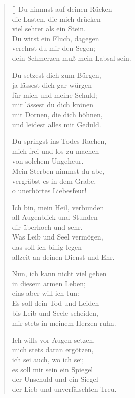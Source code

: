 \begin{multicols}{2}
\begin{verse}[\versewidth]
 Du nimmst auf deinen Rücken\\
die Lasten, die mich drücken\\
viel sehrer als ein Stein.\\
Du wirst ein Fluch, dagegen\\
verehrst du mir den Segen;\\
dein Schmerzen muß mein Labsal sein.

 Du setzest dich zum Bürgen,\\
ja lässest dich gar würgen\\
für mich und meine Schuld;\\
mir lässest du dich krönen\\
mit Dornen, die dich höhnen,\\
und leidest alles mit Geduld.

 Du springst ins Todes Rachen,\\
mich frei und los zu machen\\
von solchem Ungeheur.\\
Mein Sterben nimmst du abe,\\
vergräbst es in dem Grabe,\\
o unerhörtes Liebesfeur!

 Ich bin, mein Heil, verbunden\\
all Augenblick und Stunden\\
dir überhoch und sehr.\\
Was Leib und Seel vermögen,\\
das soll ich billig legen\\
allzeit an deinen Dienst und Ehr.

 Nun, ich kann nicht viel geben\\
in diesem armen Leben;\\
eins aber will ich tun:\\
Es soll dein Tod und Leiden\\
bis Leib und Seele scheiden,\\
mir stets in meinem Herzen ruhn.

 Ich wills vor Augen setzen,\\
mich stets daran ergötzen,\\
ich sei auch, wo ich sei;\\
es soll mir sein ein Spiegel\\
der Unschuld und ein Siegel\\
der Lieb und unverfälschten Treu.


\end{verse}
\end{multicols}

